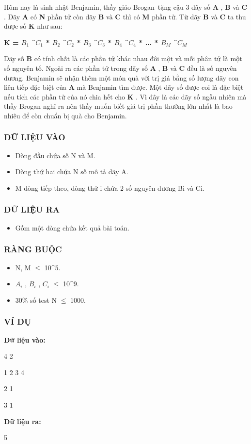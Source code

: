 



   Hôm nay là sinh nhật Benjamin, thầy giáo Brogan tặng cậu 3 dãy số   \textbf{    A   }   ,   \textbf{    B   }   và   \textbf{    C   }   . Dãy   \textbf{    A   }   có   \textbf{    N   }   phần tử còn dãy   \textbf{    B   }   và   \textbf{    C   }   thì có   \textbf{    M   }   phần tử. Từ dãy   \textbf{    B   }   và   \textbf{    C   }   ta thu được số   \textbf{    K   }   như sau:  

\textbf{    K = $B_{1}$    ^$C_{1}$    * $B_{2}$    ^$C_{2}$    * $B_{3}$    ^$C_{3}$    * $B_{4}$    ^$C_{4}$    * ... * $B_{M}$    ^$C_{M}$}

   Dãy số   \textbf{    B   }   có tính chất là các phần tử khác nhau đôi một và mỗi phân tử là một số nguyên tố. Ngoài ra các phần tử trong dãy số   \textbf{    A   }   ,   \textbf{    B   }   và   \textbf{    C   }   đều là số nguyên dương. Benjamin sẽ nhận thêm một món quà với trị giá bằng số lượng dãy con liên tiếp đặc biệt của   \textbf{    A   }   mà Benjamin tìm được. Một dãy số được coi là đặc biệt nếu tích các phần tử của nó chia hết cho   \textbf{    K   }   . Vì đây là các dãy số ngẫu nhiên mà thầy Brogan nghĩ ra nên thầy muốn biết giá trị phần thưởng lớn nhất là bao nhiêu để còn chuẩn bị quà cho Benjamin.  

\subsubsection{   DỮ LIỆU VÀO  }


\begin{itemize}
	\item     Dòng đầu chứa số N và M.   
	\item     Dòng thứ hai chứa N số mô tả dãy A.   
	\item     M dòng tiếp theo, dòng thứ i chứa 2 số nguyên dương Bi và Ci.   
\end{itemize}



\subsubsection{   DỮ LIỆU RA  }
\begin{itemize}
	\item     Gồm một dòng chứa kết quả bài toán.   
\end{itemize}

\subsubsection{   RÀNG BUỘC  }
\begin{itemize}
	\item     N, M  $\le$  10^5.   
	\item     $A_{i}$    , $B_{i}$    , $C_{i}$     $\le$  10^9.   
	\item     30\% số test N  $\le$  1000.   
\end{itemize}

\subsubsection{   VÍ DỤ  }

\textbf{    Dữ liệu vào:   }

   4 2  

   1 2 3 4  

   2 1  

   3 1  

\textbf{    Dữ liệu ra:   }

   5  
